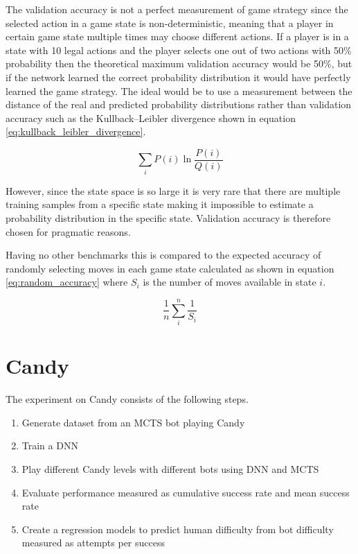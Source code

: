 \documentclass{kththesis}
\begin{document}
The validation accuracy is not a perfect measurement of game strategy since the selected action in a game state is non-deterministic, meaning that a player in  certain game state multiple times may choose different actions. If a player is in a state with 10 legal actions and the player selects one out of two actions with 50\% probability then the theoretical maximum validation accuracy would be 50\%, but if the network learned the correct probability distribution it would have perfectly learned the game strategy. The ideal would be to use a measurement between the distance of the real and predicted probability distributions rather than validation accuracy such as the Kullback–Leibler divergence shown in equation \ref{eq:kullback_leibler_divergence}.

\begin{equation}
\label{eq:kullback_leibler_divergence}
\sum_i P(i)\ln\frac{P(i)}{Q(i)}
\end{equation}

However, since the state space is so large it is very rare that there are multiple training samples from a specific state making it impossible to estimate a probability distribution in the specific state. Validation accuracy is therefore chosen for pragmatic reasons.

Having no other benchmarks this  is compared to the expected accuracy of randomly selecting moves in each game state calculated as shown in equation \ref{eq:random_accuracy} where $S_{i}$ is the number of moves available in state $i$.

\begin{equation}
\label{eq:random_accuracy}
\frac{1}{n}\sum_i^n\frac{1}{S_{i}}
\end{equation}

\section{Candy}
The experiment on Candy consists of the following steps.
\begin{enumerate}
\item Generate dataset from an MCTS bot playing Candy
\item Train a DNN
\item Play different Candy levels with different bots using DNN and MCTS
\item Evaluate performance measured as cumulative success rate and mean success rate
\item Create a regression models to predict human difficulty from bot difficulty measured as attempts per success
\end{enumerate}
\end{document}

